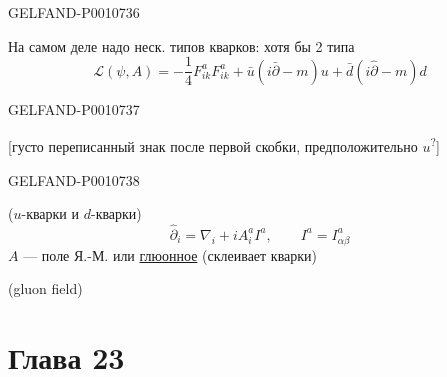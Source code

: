 \begin{GelfandAdjacentEvidence}{GELFAND-P001073}{6}


На самом деле надо неск. типов кварков: хотя бы 2 типа
\begin{equation*}
\mathcal L(\psi,A)=-\frac14F_{ik}^aF_{ik}^a+\bar u(i\bar\partial-m)u+\bar d(i\hat\partial-m)d
\tag{25}
\end{equation*}
\end{GelfandAdjacentEvidence}
\begin{GelfandAdjacentEvidence}{GELFAND-P001073}{7}

[густо переписанный знак после первой скобки, предположительно \(u\)\textsuperscript{?}]
\end{GelfandAdjacentEvidence}
\begin{GelfandAdjacentEvidence}{GELFAND-P001073}{8}


($u$-кварки и $d$-кварки)
\begin{equation*}
\hat\partial_i=\nabla_i+iA_i^a I^a,\qquad I^a=I^a_{\alpha\beta}
\tag{26}
\end{equation*}
$A$ — поле Я.-М. или \uline{глюонное} (склеивает кварки)

(gluon field)
\end{GelfandAdjacentEvidence}



\clearpage{}
\section*{Глава 23}


